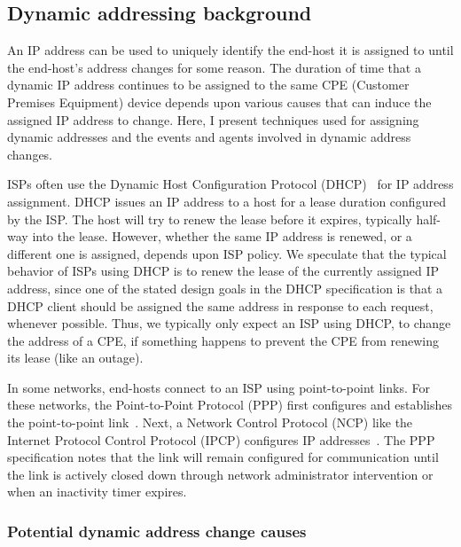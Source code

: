 
\subsection{Dynamic addressing background}

An IP address can be used to uniquely identify the end-host it is assigned to
until the end-host's address changes for some reason. The duration of
time that a dynamic IP address continues to be assigned to the same
CPE (Customer Premises Equipment) device depends upon various causes that can induce the assigned IP
address to change. Here, I present techniques used for
assigning dynamic addresses and the events and
agents involved in dynamic address changes.

ISPs often use the Dynamic Host Configuration Protocol
(DHCP)~\cite{rfc2131} for IP address assignment. DHCP issues an IP address to a host for a lease
duration configured by the ISP. The host will try to renew the lease
before it expires, typically half-way into the lease. However,
whether the same IP address is renewed, or a different one is
assigned, depends upon ISP policy.  We speculate that the
typical behavior of ISPs using DHCP is to renew the lease of the
currently assigned IP address, since one of the stated design goals
in the DHCP specification is that a DHCP client should be assigned the same address
in response to each request, whenever possible. Thus, we typically
only expect an ISP using DHCP, to change the address of a CPE, if
something happens to prevent the CPE from renewing its lease (like an outage).

In some networks, end-hosts connect to an ISP using
point-to-point links. For these networks, the Point-to-Point Protocol
(PPP) first configures and establishes the point-to-point link~\cite{rfc1661}. Next,
a Network Control Protocol (NCP) like the Internet Protocol Control
Protocol (IPCP) configures IP addresses~\cite{rfc1332}. The PPP specification
notes that the link will remain configured for communication until the
link is actively closed down through network administrator
intervention or when an inactivity timer expires.

\subsubsection{Potential dynamic address change causes} 

